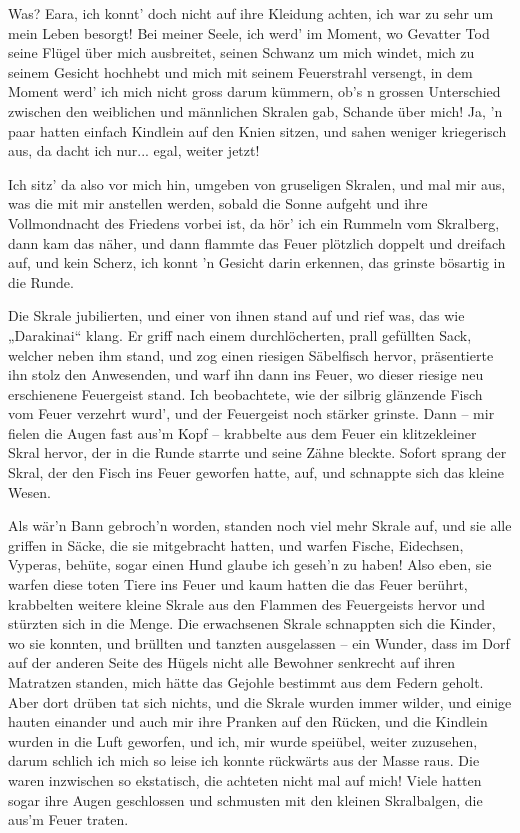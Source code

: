 Was? Eara, ich konnt’ doch nicht auf ihre Kleidung achten, ich war zu sehr um mein Leben besorgt! Bei meiner Seele, ich werd’ im Moment, wo Gevatter Tod seine Flügel über mich ausbreitet, seinen Schwanz um mich windet, mich zu seinem Gesicht hochhebt und mich mit seinem Feuerstrahl versengt, in dem Moment werd’ ich mich nicht gross darum kümmern, ob’s n grossen Unterschied zwischen den weiblichen und männlichen Skralen gab, Schande über mich! Ja, ’n paar hatten einfach Kindlein auf den Knien sitzen, und sahen weniger kriegerisch aus, da dacht ich nur... egal, weiter jetzt!

Ich sitz’ da also vor mich hin, umgeben von gruseligen Skralen, und mal mir aus, was die mit mir anstellen werden, sobald die Sonne aufgeht und ihre Vollmondnacht des Friedens vorbei ist, da hör’ ich ein Rummeln vom Skralberg, dann kam das näher, und dann flammte das Feuer plötzlich doppelt und dreifach auf, und kein Scherz, ich konnt ’n Gesicht darin erkennen, das grinste bösartig in die Runde.

Die Skrale jubilierten, und einer von ihnen stand auf und rief was, das wie „Darakinai“ klang. Er griff nach einem durchlöcherten, prall gefüllten Sack, welcher neben ihm stand, und zog einen riesigen Säbelfisch hervor, präsentierte ihn stolz den Anwesenden, und warf ihn dann ins Feuer, wo dieser riesige neu erschienene Feuergeist stand. Ich beobachtete, wie der silbrig glänzende Fisch vom Feuer verzehrt wurd', und der Feuergeist noch stärker grinste. Dann – mir fielen die Augen fast aus’m Kopf – krabbelte aus dem Feuer ein klitzekleiner Skral hervor, der in die Runde starrte und seine Zähne bleckte. Sofort sprang der Skral, der den Fisch ins Feuer geworfen hatte, auf, und schnappte sich das kleine Wesen.

Als wär’n Bann gebroch’n worden, standen noch viel mehr Skrale auf, und sie alle griffen in Säcke, die sie mitgebracht hatten, und warfen Fische, Eidechsen, Vyperas, behüte, sogar einen Hund glaube ich geseh’n zu haben! Also eben, sie warfen diese toten Tiere ins Feuer und kaum hatten die das Feuer berührt, krabbelten weitere kleine Skrale aus den Flammen des Feuergeists hervor und stürzten sich in die Menge. Die erwachsenen Skrale schnappten sich die Kinder, wo sie konnten, und brüllten und tanzten ausgelassen – ein Wunder, dass im Dorf auf der anderen Seite des Hügels nicht alle Bewohner senkrecht auf ihren Matratzen standen, mich hätte das Gejohle bestimmt aus dem Federn geholt. Aber dort drüben tat sich nichts, und die Skrale wurden immer wilder, und einige hauten einander und auch mir ihre Pranken auf den Rücken, und die Kindlein wurden in die Luft geworfen, und ich, mir wurde speiübel, weiter zuzusehen, darum schlich ich mich so leise ich konnte rückwärts aus der Masse raus. Die waren inzwischen so ekstatisch, die achteten nicht mal auf mich! Viele hatten sogar ihre Augen geschlossen und schmusten mit den kleinen Skralbalgen, die aus’m Feuer traten.

